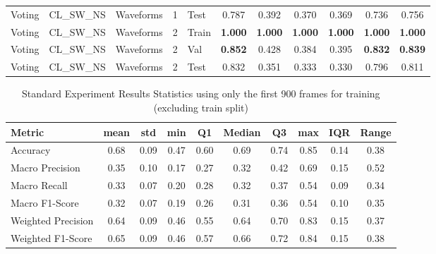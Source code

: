 \begin{landscape}
\begin{longtable}{|l|l|l|l|l|c|c|c|c|c|c|}
Voting & CL\_SW\_NS & Waveforms & 1 & Test & 0.787 & 0.392 & 0.370 & 0.369 & 0.736 & 0.756 \\
Voting & CL\_SW\_NS & Waveforms & 2 & Train & \textbf{1.000} & \textbf{1.000} & \textbf{1.000} & \textbf{1.000} & \textbf{1.000} & \textbf{1.000} \\
Voting & CL\_SW\_NS & Waveforms & 2 & Val & \textbf{0.852} & 0.428 & 0.384 & 0.395 & \textbf{0.832} & \textbf{0.839} \\
Voting & CL\_SW\_NS & Waveforms & 2 & Test & 0.832 & 0.351 & 0.333 & 0.330 & 0.796 & 0.811 \\
\end{longtable}
\end{landscape}

\begin{table}[h]
\caption{Standard Experiment Results Statistics using only the first 900 frames for training (excluding train split)}
\label{tab:_900_Standard_Results_Statistics}
\begin{tabular}{|l|c|c|c|c|c|c|c|c|c|}
\toprule
Metric & mean & std & min & Q1 & Median & Q3 & max & IQR & Range \\
\midrule
Accuracy & 0.68 & 0.09 & 0.47 & 0.60 & 0.69 & 0.74 & 0.85 & 0.14 & 0.38 \\
Macro Precision & 0.35 & 0.10 & 0.17 & 0.27 & 0.32 & 0.42 & 0.69 & 0.15 & 0.52 \\
Macro Recall & 0.33 & 0.07 & 0.20 & 0.28 & 0.32 & 0.37 & 0.54 & 0.09 & 0.34 \\
Macro F1-Score & 0.32 & 0.07 & 0.19 & 0.26 & 0.31 & 0.36 & 0.54 & 0.10 & 0.35 \\
Weighted Precision & 0.64 & 0.09 & 0.46 & 0.55 & 0.64 & 0.70 & 0.83 & 0.15 & 0.37 \\
Weighted F1-Score & 0.65 & 0.09 & 0.46 & 0.57 & 0.66 & 0.72 & 0.84 & 0.15 & 0.38 \\
\bottomrule
\end{tabular}
\end{table}